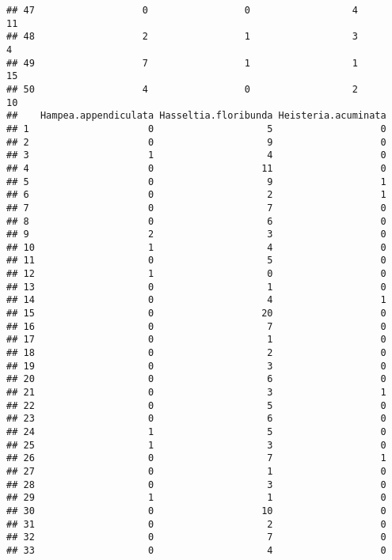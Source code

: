 \documentclass[
]{article}
\begin{document}
\begin{verbatim}
## 47                   0                 0                  4               11
## 48                   2                 1                  3                4
## 49                   7                 1                  1               15
## 50                   4                 0                  2               10
##    Hampea.appendiculata Hasseltia.floribunda Heisteria.acuminata
## 1                     0                    5                   0
## 2                     0                    9                   0
## 3                     1                    4                   0
## 4                     0                   11                   0
## 5                     0                    9                   1
## 6                     0                    2                   1
## 7                     0                    7                   0
## 8                     0                    6                   0
## 9                     2                    3                   0
## 10                    1                    4                   0
## 11                    0                    5                   0
## 12                    1                    0                   0
## 13                    0                    1                   0
## 14                    0                    4                   1
## 15                    0                   20                   0
## 16                    0                    7                   0
## 17                    0                    1                   0
## 18                    0                    2                   0
## 19                    0                    3                   0
## 20                    0                    6                   0
## 21                    0                    3                   1
## 22                    0                    5                   0
## 23                    0                    6                   0
## 24                    1                    5                   0
## 25                    1                    3                   0
## 26                    0                    7                   1
## 27                    0                    1                   0
## 28                    0                    3                   0
## 29                    1                    1                   0
## 30                    0                   10                   0
## 31                    0                    2                   0
## 32                    0                    7                   0
## 33                    0                    4                   0

\end{verbatim}
\end{document}
